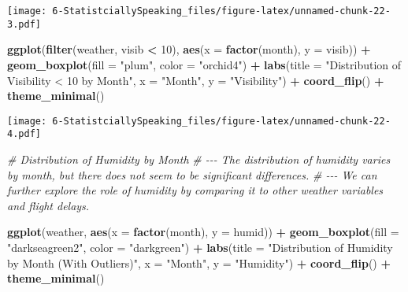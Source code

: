 \documentclass[
]{article}
\newenvironment{Shaded}{\begin{snugshade}}{\end{snugshade}}
\newcommand{\AttributeTok}[1]{\textcolor[rgb]{0.13,0.29,0.53}{#1}}
\newcommand{\CommentTok}[1]{\textcolor[rgb]{0.56,0.35,0.01}{\textit{#1}}}
\newcommand{\DecValTok}[1]{\textcolor[rgb]{0.00,0.00,0.81}{#1}}
\newcommand{\FunctionTok}[1]{\textcolor[rgb]{0.13,0.29,0.53}{\textbf{#1}}}
\newcommand{\NormalTok}[1]{#1}
\newcommand{\SpecialCharTok}[1]{\textcolor[rgb]{0.81,0.36,0.00}{\textbf{#1}}}
\newcommand{\StringTok}[1]{\textcolor[rgb]{0.31,0.60,0.02}{#1}}
\begin{document}
\texttt{[image: 6-StatistciallySpeaking\_files/figure-latex/unnamed-chunk-22-3.pdf]}

\begin{Shaded}
\begin{Highlighting}[]
\FunctionTok{ggplot}\NormalTok{(}\FunctionTok{filter}\NormalTok{(weather, visib }\SpecialCharTok{\textless{}} \DecValTok{10}\NormalTok{), }\FunctionTok{aes}\NormalTok{(}\AttributeTok{x =} \FunctionTok{factor}\NormalTok{(month), }\AttributeTok{y =}\NormalTok{ visib)) }\SpecialCharTok{+}
  \FunctionTok{geom\_boxplot}\NormalTok{(}\AttributeTok{fill =} \StringTok{"plum"}\NormalTok{, }\AttributeTok{color =} \StringTok{"orchid4"}\NormalTok{) }\SpecialCharTok{+}
  \FunctionTok{labs}\NormalTok{(}\AttributeTok{title =} \StringTok{"Distribution of Visibility \textless{} 10 by Month"}\NormalTok{,}
       \AttributeTok{x =} \StringTok{"Month"}\NormalTok{,}
       \AttributeTok{y =} \StringTok{"Visibility"}\NormalTok{) }\SpecialCharTok{+}
  \FunctionTok{coord\_flip}\NormalTok{() }\SpecialCharTok{+}
  \FunctionTok{theme\_minimal}\NormalTok{()}
\end{Highlighting}
\end{Shaded}

\texttt{[image: 6-StatistciallySpeaking\_files/figure-latex/unnamed-chunk-22-4.pdf]}

\begin{Shaded}
\begin{Highlighting}[]
\CommentTok{\# Distribution of Humidity by Month}
\CommentTok{\# {-}{-}{-} The distribution of humidity varies by month, but there does not seem to be significant differences.}
\CommentTok{\# {-}{-}{-} We can further explore the role of humidity by comparing it to other weather variables and flight delays.}

\FunctionTok{ggplot}\NormalTok{(weather, }\FunctionTok{aes}\NormalTok{(}\AttributeTok{x =} \FunctionTok{factor}\NormalTok{(month), }\AttributeTok{y =}\NormalTok{ humid)) }\SpecialCharTok{+}
  \FunctionTok{geom\_boxplot}\NormalTok{(}\AttributeTok{fill =} \StringTok{"darkseagreen2"}\NormalTok{, }\AttributeTok{color =} \StringTok{"darkgreen"}\NormalTok{) }\SpecialCharTok{+}
  \FunctionTok{labs}\NormalTok{(}\AttributeTok{title =} \StringTok{"Distribution of Humidity by Month (With Outliers)"}\NormalTok{,}
       \AttributeTok{x =} \StringTok{"Month"}\NormalTok{,}
       \AttributeTok{y =} \StringTok{"Humidity"}\NormalTok{) }\SpecialCharTok{+}
  \FunctionTok{coord\_flip}\NormalTok{() }\SpecialCharTok{+}
  \FunctionTok{theme\_minimal}\NormalTok{()}
\end{Highlighting}
\end{Shaded}
\end{document}
